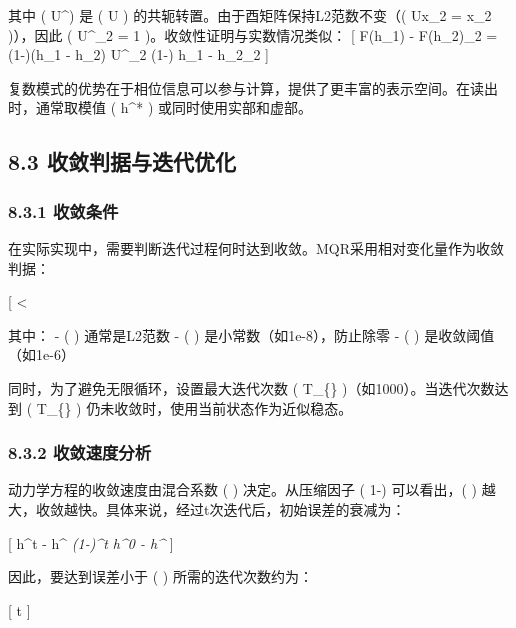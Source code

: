 \documentclass[
  12pt,
]{article}
\begin{document}
其中 ( U\^{}\dagger ) 是 ( U ) 的共轭转置。由于酉矩阵保持L2范数不变（(
\textbar Ux\textbar\_2 = \textbar x\textbar\_2 )），因此 (
\textbar U\^{}\dagger\textbar\_2 = 1 )。收敛性证明与实数情况类似： {[}
\textbar{}F(h\_1) - F(h\_2)\textbar\_2 =
\textbar(1-\alpha)(h\_1 - h\_2) U\^{}\dagger\textbar\_2 \leq (1-\alpha)
\textbar h\_1 - h\_2\textbar\_2 {]}

复数模式的优势在于相位信息可以参与计算，提供了更丰富的表示空间。在读出时，通常取模值
( \textbar h\^{}*\textbar{} ) 或同时使用实部和虚部。

\hypertarget{ux6536ux655bux5224ux636eux4e0eux8fedux4ee3ux4f18ux5316}{%
\subsection{8.3
收敛判据与迭代优化}\label{ux6536ux655bux5224ux636eux4e0eux8fedux4ee3ux4f18ux5316}}

\hypertarget{ux6536ux655bux6761ux4ef6}{%
\subsubsection{8.3.1 收敛条件}\label{ux6536ux655bux6761ux4ef6}}

在实际实现中，需要判断迭代过程何时达到收敛。MQR采用相对变化量作为收敛判据：

{[}  \textless{} \tau {]}

其中： - ( \textbar{}\cdot\textbar{} ) 通常是L2范数 - ( \epsilon )
是小常数（如1e-8），防止除零 - ( \tau ) 是收敛阈值（如1e-6）

同时，为了避免无限循环，设置最大迭代次数 ( T\_\{\max\}
)（如1000）。当迭代次数达到 ( T\_\{\max\} )
仍未收敛时，使用当前状态作为近似稳态。

\hypertarget{ux6536ux655bux901fux5ea6ux5206ux6790}{%
\subsubsection{8.3.2
收敛速度分析}\label{ux6536ux655bux901fux5ea6ux5206ux6790}}

动力学方程的收敛速度由混合系数 ( \alpha ) 决定。从压缩因子 ( 1-\alpha )
可以看出，( \alpha )
越大，收敛越快。具体来说，经过t次迭代后，初始误差的衰减为：

{[} \textbar h\^{}t - h\^{}\emph{\textbar{} \leq (1-\alpha)\^{}t
\textbar h\^{}0 - h\^{}}\textbar{} {]}

因此，要达到误差小于 ( \delta ) 所需的迭代次数约为：

{[} t \geq {} {]}
\end{document}
